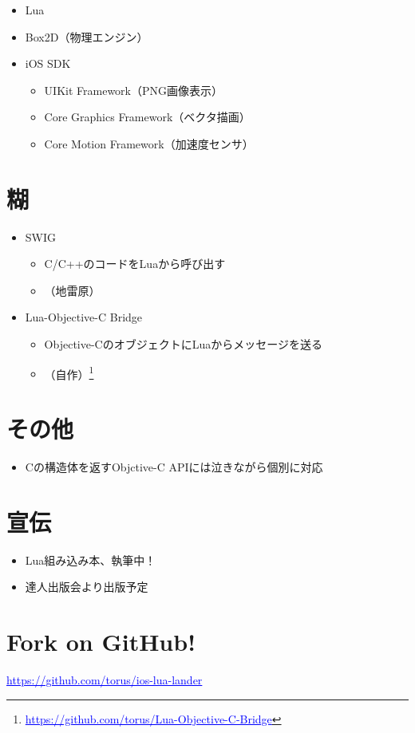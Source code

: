 \documentclass[slide,papersize]{jsarticle}
\newcommand{\link}[1]{\textcolor[named]{Blue}{\underline{#1}}}
\begin{document}
\begin{itemize}
 \item Lua
 \item Box2D（物理エンジン）
 \item iOS SDK
       \begin{itemize}
        \item UIKit Framework（PNG画像表示）
        \item Core Graphics Framework（ベクタ描画）
        \item Core Motion Framework（加速度センサ）
       \end{itemize}
\end{itemize}


\section*{糊}

\begin{itemize}
 \item SWIG
       \begin{itemize}
        \item C/C++のコードをLuaから呼び出す
        \item （地雷原）
       \end{itemize}

 \item Lua-Objective-C Bridge
       \begin{itemize}
        \item Objective-CのオブジェクトにLuaからメッセージを送る
        \item （自作）\footnote{\link{https://github.com/torus/Lua-Objective-C-Bridge}}
       \end{itemize}
\end{itemize}

\section*{その他}

\begin{itemize}
  \item Cの構造体を返すObjctive-C APIには泣きながら個別に対応
\end{itemize}

\section*{宣伝}

\begin{itemize}
 \item Lua組み込み本、執筆中！
 \item 達人出版会より出版予定
\end{itemize}

\section*{Fork on GitHub!}


\vspace*{1cm}

\begin{center}
\link{https://github.com/torus/ios-lua-lander}
\end{center}
\end{document}
